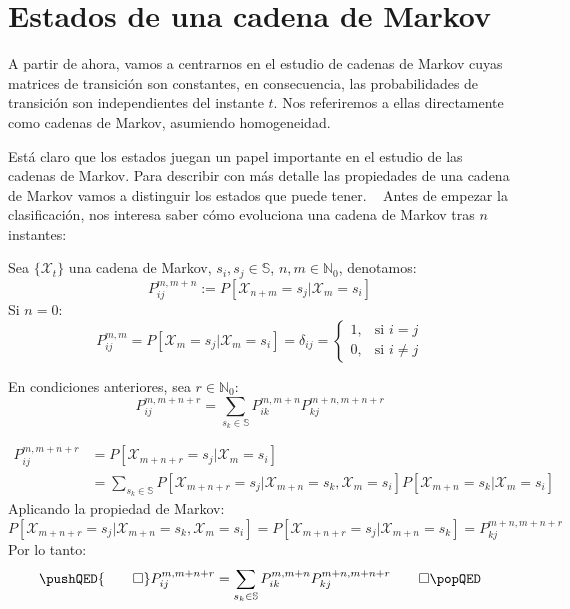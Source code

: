 \section{Estados de una cadena de Markov}
A partir de ahora, vamos a centrarnos en el estudio de cadenas de Markov cuyas matrices de transición son constantes, en consecuencia, las probabilidades de transición son independientes del instante $t$. Nos referiremos a ellas directamente como cadenas de Markov, asumiendo homogeneidad. 

Está claro que los estados juegan un papel importante en el estudio de las cadenas de Markov. Para describir con más detalle las propiedades de una cadena de Markov vamos a distinguir los estados que puede tener. ~\cite{Barbosa} Antes de empezar la clasificación, nos interesa saber cómo evoluciona una cadena de Markov tras $n$ instantes:


\begin{definition}
Sea $\{\mathcal{X}_t\}$ una cadena de Markov, $s_i, s_j \in \mathbb{S}$, $n,m\in\mathbb{N}_0$, denotamos:
\[P_{ij}^{m,m+n}:=P[\mathcal{X}_{n+m}=s_j|\mathcal{X}_m=s_i]\]
Si $n=0$:
\[P_{ij}^{m,m}=P[\mathcal{X}_{m}=s_j|\mathcal{X}_m=s_i]=\delta_{ij}=
\begin{cases}
    1, & \text{si } i=j\\
    0, &         \text{si } i\neq j
\end{cases}\]
\end{definition}
\begin{theorem}
En condiciones anteriores, sea $r\in \mathbb{N}_0$:
\[P_{ij}^{m,m+n+r}=\sum_{s_k\in\mathbb{S}}P_{ik}^{m,m+n}P_{kj}^{m+n,m+n+r}\]
\end{theorem}
\begin{proofs*}
    \[ 
    \begin{aligned}   
    P_{ij}^{m,m+n+r}&=P[\mathcal{X}_{m+n+r}=s_j|\mathcal{X}_m=s_i]\\
    &=\sum_{s_k\in\mathbb{S}} P[\mathcal{X}_{m+n+r}=s_j |\mathcal{X}_{m+n}=s_k,\mathcal{X}_m=s_i ] P[\mathcal{X}_{m+n}=s_k|\mathcal{X}_m=s_i ]
    \end{aligned} 
    \]
Aplicando la propiedad de Markov:
    \[P[\mathcal{X}_{m+n+r}=s_j |\mathcal{X}_{m+n}=s_k,\mathcal{X}_m=s_i ]=P[\mathcal{X}_{m+n+r}=s_j |\mathcal{X}_{m+n}=s_k]=P_{kj}^{m+n,m+n+r}\]
Por lo tanto:
    \[
    \pushQED{\qed}
    P_{ij}^{m,m+n+r}=\sum_{s_k\in\mathbb{S}}P_{ik}^{m,m+n}P_{kj}^{m+n,m+n+r}\qedhere
    \popQED\]
    
\end{proofs*}

